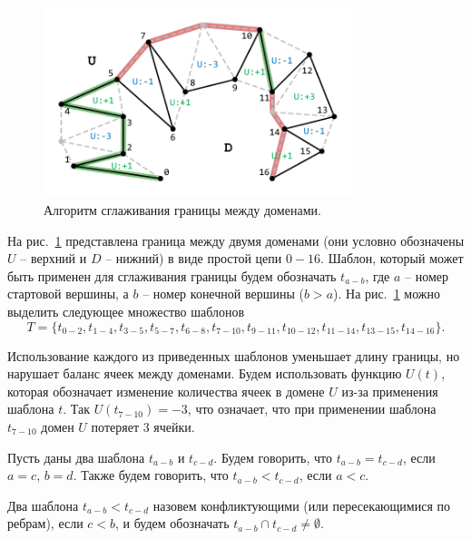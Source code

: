 \begin{figure}[ht]
\centering
\includegraphics[width=0.8\textwidth]{fig/par_smooth.pdf}
\singlespacing
{}\caption{Алгоритм сглаживания границы между доменами.}
\label{fig:text_2_smooth_smooth}
\end{figure}

На рис.~\ref{fig:text_2_smooth_smooth} представлена граница между двумя доменами (они условно обозначены $U$ -- верхний и $D$ -- нижний) в виде простой цепи $0-16$.
Шаблон, который может быть применен для сглаживания границы будем обозначать $t_{a-b}$, где $a$ -- номер стартовой вершины, а $b$ -- номер конечной вершины ($b > a$).
На рис.~\ref{fig:text_2_smooth_smooth} можно выделить следующее множество шаблонов
\begin{equation}
T = \{ t_{0-2}, t_{1-4}, t_{3-5}, t_{5-7}, t_{6-8}, t_{7-10}, t_{9-11}, t_{10-12}, t_{11-14}, t_{13-15}, t_{14-16} \}.
\end{equation}

Использование каждого из приведенных шаблонов уменьшает длину границы, но нарушает баланс ячеек между доменами.
Будем использовать функцию $U(t)$, которая обозначает изменение количества ячеек в домене $U$ из-за применения шаблона $t$.
Так $U(t_{7-10}) = -3$, что означает, что при применении шаблона $t_{7-10}$ домен $U$ потеряет 3 ячейки.

\begin{definition}
Пусть даны два шаблона $t_{a-b}$ и $t_{c-d}$.
Будем говорить, что $t_{a-b} = t_{c-d}$, если $a = c$, $b = d$.
Также будем говорить, что $t_{a-b} < t_{c-d}$, если $a < c$.
\end{definition}

\begin{definition}
Два шаблона $t_{a-b} < t_{c-d}$ назовем конфликтующими (или пересекающимися по ребрам), если $c < b$, и будем обозначать $t_{a-b} \cap t_{c-d} \ne \emptyset$.
\end{definition}

